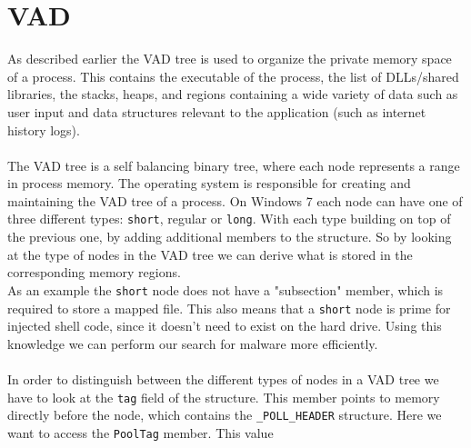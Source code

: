 \documentclass[a4paper]{article}
\begin{document}
\section{VAD}
As described earlier the VAD tree is used to organize the private memory space of a process. This contains the executable of the process, the list of DLLs/shared libraries, the stacks, heaps, and
regions containing a wide variety of data such as user input and data structures relevant to the application (such as internet history logs). \\ \\
%
The VAD tree is a self balancing binary tree, where each node represents a range in process memory. The operating system is responsible for creating and maintaining the VAD tree of a
process. 
%
On Windows 7 each node can have one of three different types: \texttt{short}, regular or \texttt{long}. With each type building on top of the previous one, by adding additional members to the structure. 
So by looking at the type of nodes in the VAD tree we can derive what is stored in the corresponding memory regions. \\
As an example the \texttt{short} node does not have a "subsection" member, which is required to store
a mapped file. This also means that a \texttt{short} node is prime for injected shell code, since it doesn't
need to exist on the hard drive. Using this knowledge we can perform our search for malware more
efficiently. \\ \\
%
In order to distinguish between the different types of nodes in a VAD tree we have to look at
the \texttt{tag} field of the structure. This member points to memory directly before the node, which
contains the \texttt{\_POLL\_HEADER} structure. Here we want to access the \texttt{PoolTag} member. This value
\end{document}
